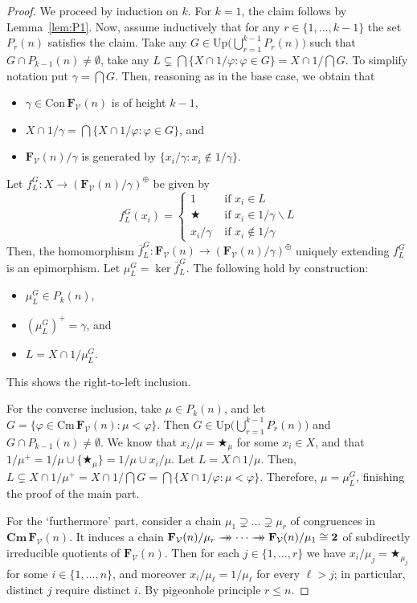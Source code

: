 \documentclass{amsart}
\newcommand{\alg}[1]{\mathbf{#1}}
\newcommand{\ov}[1]{\overline{#1}}
\newcommand{\FV}{\alg{F}_\mathcal{V}}
\newcommand{\con}[1]{\mathrm{Con}\, #1}
\newcommand{\Cm}[1]{\mathbf{Cm}\, #1}
\newcommand{\cm}[1]{\mathrm{Cm}\, #1}
\newcommand{\onto}{\rightarrow\mathrel{\mkern-14mu}\rightarrow}
\def\op{\bigstar}
\begin{document}
\begin{proof}
We proceed by induction on $k$. For $k=1$, the claim follows by
Lemma~\ref{lem:P1}.
Now, assume inductively that for any $r\in \{1,\dots, k-1\}$
the set $P_r(n)$ satisfies the claim. 
Take any $G\in \mathrm{Up}\bigl(\bigcup_{r=1}^{k-1}
P_r(n)\bigr)$ such that $G\cap P_{k-1}(n)\neq \emptyset$, take any
$L\subsetneq \bigcap\{X\cap 1/\varphi: \varphi \in G\}
= X\cap 1/\bigcap G$.
To simplify notation put $\gamma = \bigcap G$.
Then, reasoning as in the base case, we obtain that
\begin{itemize}
\item[(i)] $\gamma\in \con{\FV(n)}$ is of height $k-1$,
\item[(ii)] $X\cap 1/\gamma = \bigcap\{X\cap 1/\varphi: \varphi \in G\}$, and
\item[(iii)] $\FV(n)/\gamma$ is generated by
  $\{x_i/\gamma: x_i\notin 1/\gamma\}$.
\end{itemize}  
Let $f^G_L\colon X \to  \left(\FV(n)/\gamma\right)^\oplus$
be given by 
$$
f^G_L(x_i) =\begin{cases}
  1 & \text{ if } x_i\in L\\
  \op & \text{ if } x_i\in 1/\gamma\smallsetminus L\\
  x_i/\gamma & \text{ if } x_i\notin 1/\gamma
\end{cases}
$$
Then, the homomorphism
$\ov{f}^G_L\colon \FV(n) \to \left(\FV(n)/\gamma\right)^\oplus$
uniquely extending $f^G_L$ is an epimorphism.  Let $\mu^G_L = \ker\ov{f}^G_L$.
The following hold by construction:
\begin{itemize}
\item[(i)] $\mu^G_L\in P_k(n)$,
\item[(ii)] $(\mu^G_L)^+ = \gamma$, and
\item[(iii)] $L = X\cap 1/\mu^G_L$.
\end{itemize}
This shows the right-to-left inclusion.

For the converse inclusion, take $\mu\in P_k(n)$, and let  
$G = \{\varphi\in\cm{\FV(n)}: \mu<\varphi\}$. Then
$G\in\mathrm{Up}\bigl(\bigcup_{r=1}^{k-1}P_r(n)\bigr)$ and 
$G\cap P_{k-1}(n)\neq\emptyset$. We know that 
$x_i/\mu = \op_\mu$ for some $x_i\in X$, and that
$1/\mu^+ = 1/\mu\cup\{\op_\mu\} = 1/\mu\cup x_i/\mu$. 
Let $L = X\cap 1/\mu$. Then, 
$L\subsetneq X\cap 1/\mu^+ =  X\cap 1/\bigcap G =
\bigcap\{X\cap 1/\varphi: \mu<\varphi\}$. 
Therefore, $\mu = \mu^G_L$, finishing the proof of the main part.

For the `furthermore' part, consider a chain
$\mu_1\supsetneq\dots\supsetneq\mu_r$ of congruences
in $\Cm{\FV(n)}$. It induces a chain
$\FV(n)/\mu_r\onto \dots \onto \FV(n)/\mu_1\cong \alg{2}$
of subdirectly irreducible quotients of $\FV(n)$.  Then
for each $j \in \{1,\dots,r\}$ we have $x_i/\mu_j = \op_{\mu_j}$ for some $i\in
\{1,\dots,n\}$, and moreover $x_i/\mu_\ell = 1/\mu_\ell$ for every
$\ell>j$; in particular, distinct $j$ require distinct $i$. By pigeonhole principle $r \leq n$.
\end{proof}  
\end{document}
